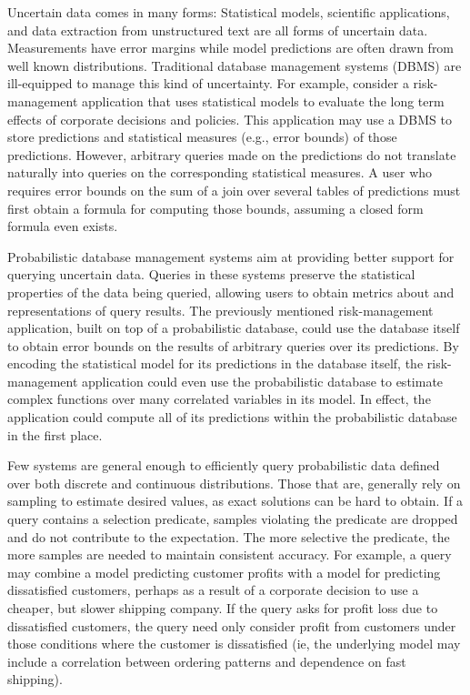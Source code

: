 Uncertain data comes in many forms: Statistical models, scientific applications, and data extraction from unstructured text are all forms of uncertain data.  Measurements have error margins while model predictions are often drawn from well known distributions.  Traditional database management systems (DBMS) are ill-equipped to manage this kind of uncertainty.  For example, consider a risk-management application that uses statistical models to evaluate the long term effects of corporate decisions and policies.  This application may use a DBMS to store predictions and statistical measures (e.g., error bounds) of those predictions.  However, arbitrary queries made on the predictions do not translate naturally into queries on the corresponding statistical measures.  A user who requires error bounds on the sum of a join over several tables of predictions must first obtain a formula for computing those bounds, assuming a closed form formula even exists.

Probabilistic  database  management  systems \cite{CKP2003, dalvi07efficient, WidomTrio2008, DM2006, KochMayBMS2008, SD2007, ORION, MCDB, BayesStore} aim at providing better support for querying uncertain data.  Queries in these systems preserve the statistical properties of the data being queried, allowing users to obtain metrics about and representations of query results.  The previously mentioned risk-management application, built on top of a probabilistic database, could use the database itself to obtain error bounds on the results of arbitrary queries over its predictions.  By encoding the statistical model for its predictions in the database itself, the risk-management application could even use the probabilistic database to estimate complex functions over many correlated variables in its model.  In effect, the application could compute all of its predictions within the probabilistic database in the first place.

Few systems are general enough to efficiently query probabilistic data defined over both discrete and continuous distributions.  Those that are, generally rely on sampling to estimate desired values, as exact solutions can be hard to obtain.  If a query contains a selection predicate, samples violating the predicate are dropped and do not contribute to the expectation.  The more selective the predicate, the more samples are needed to maintain consistent accuracy.  For example, a query may combine a model predicting customer profits with a model for predicting dissatisfied customers, perhaps as a result of a corporate decision to use a cheaper, but slower shipping company.  If the query asks for profit loss due to dissatisfied customers, the query need only consider profit from customers under those conditions where the customer is dissatisfied (ie, the underlying model may include a correlation between ordering patterns and dependence on fast shipping).  

